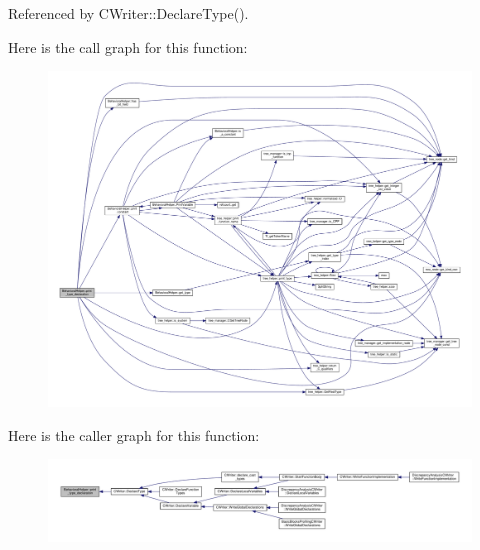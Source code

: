 Referenced by C\+Writer\+::\+Declare\+Type().

Here is the call graph for this function\+:
\nopagebreak
\begin{figure}[H]
\begin{center}
\leavevmode
\includegraphics[width=350pt]{dd/db2/classBehavioralHelper_a9bf58062df2401ac3abb1fb4925a7d80_cgraph}
\end{center}
\end{figure}
Here is the caller graph for this function\+:
\nopagebreak
\begin{figure}[H]
\begin{center}
\leavevmode
\includegraphics[width=350pt]{dd/db2/classBehavioralHelper_a9bf58062df2401ac3abb1fb4925a7d80_icgraph}
\end{center}
\end{figure}
\mbox{\label{classBehavioralHelper_ac4cf5e71318df6a6adf0685540cbb22b}} 
